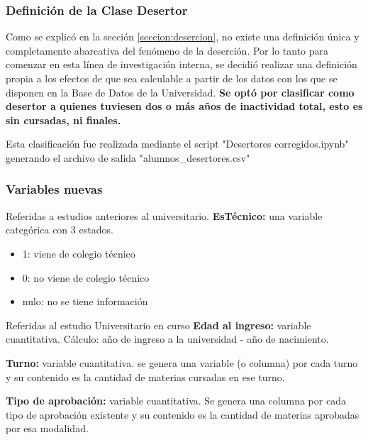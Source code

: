 \subsubsection{Definición de la Clase Desertor}

Como se explicó en la sección \ref{seccion:desercion}, no existe una definición única y completamente abarcativa del fenómeno de la deserción. 
Por lo tanto para comenzar en esta línea de investigación interna, se decidió realizar una definición propia a los efectos de que sea calculable a partir de los datos con los que se disponen en la  Base de Datos de la Universidad. \textbf{Se optó por clasificar como desertor a quienes tuviesen dos o más años de inactividad total, esto es sin cursadas, ni finales.}

Esta clasificación fue realizada mediante el script "Desertores corregidos.ipynb" generando el archivo de salida "alumnos\_desertores.csv"



\subsubsection{Variables nuevas}
Referidas a estudios anteriores al universitario.
\textbf{EsTécnico:} una variable categórica con 3 estados.
\begin{itemize}
\item 1: viene de colegio técnico
\item 0: no viene de colegio técnico
\item nulo: no se tiene información
\end{itemize}

\vspace{3mm}

Referidas al estudio Universitario en curso
\textbf{Edad al ingreso:} variable cuantitativa. Cálculo: año de ingreso a la universidad - año de nacimiento.

\vspace{3mm}

\textbf{Turno:} variable cuantitativa. se genera una variable (o columna) por cada turno y su contenido es la cantidad de materias cursadas en ese turno.

\vspace{3mm}

\textbf{Tipo de aprobación:} variable cuantitativa. Se genera una columna por cada tipo de aprobación existente y su contenido es la cantidad de materias aprobadas por esa modalidad.


